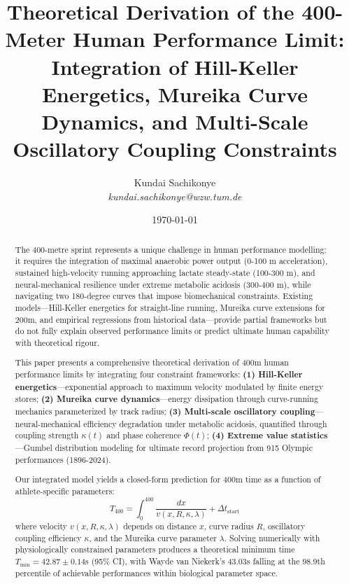 \documentclass[12pt,a4paper]{article}
\title{\textbf{Theoretical Derivation of the 400-Meter Human Performance Limit: Integration of Hill-Keller Energetics, Mureika Curve Dynamics, and Multi-Scale Oscillatory Coupling Constraints}}
\author{
Kundai Sachikonye\\
\textit{kundai.sachikonye@wzw.tum.de}\\
}
\date{\today}
\begin{document}
\maketitle

\begin{abstract}
The 400-metre sprint represents a unique challenge in human performance modelling: it requires the integration of maximal anaerobic power output (0-100 m acceleration), sustained high-velocity running approaching lactate steady-state (100-300 m), and neural-mechanical resilience under extreme metabolic acidosis (300-400 m), while navigating two 180-degree curves that impose biomechanical constraints. Existing models—Hill-Keller energetics \citep{Keller1973, Hill1928} for straight-line running, Mureika curve extensions \citep{Mureika1997} for 200m, and empirical regressions from historical data—provide partial frameworks but do not fully explain observed performance limits or predict ultimate human capability with theoretical rigour.

This paper presents a comprehensive theoretical derivation of 400m human performance limits by integrating four constraint frameworks: \textbf{(1) Hill-Keller energetics}—exponential approach to maximum velocity modulated by finite energy stores; \textbf{(2) Mureika curve dynamics}—energy dissipation through curve-running mechanics parameterized by track radius; \textbf{(3) Multi-scale oscillatory coupling}—neural-mechanical efficiency degradation under metabolic acidosis, quantified through coupling strength $\kappa(t)$ and phase coherence $\Phi(t)$; \textbf{(4) Extreme value statistics}—Gumbel distribution modeling for ultimate record projection from 915 Olympic performances (1896-2024).

Our integrated model yields a closed-form prediction for 400m time as a function of athlete-specific parameters:
\[
T_{400} = \int_0^{400} \frac{dx}{v(x,R,\kappa,\lambda)} + \Delta t_{\text{start}}
\]
where velocity $v(x,R,\kappa,\lambda)$ depends on distance $x$, curve radius $R$, oscillatory coupling efficiency $\kappa$, and the Mureika curve parameter $\lambda$. Solving numerically with physiologically constrained parameters produces a theoretical minimum time $T_{\min} = 42.87 \pm 0.14$s (95\% CI), with Wayde van Niekerk's 43.03s falling at the 98.9th percentile of achievable performances within biological parameter space.


\end{abstract}
\end{document}
